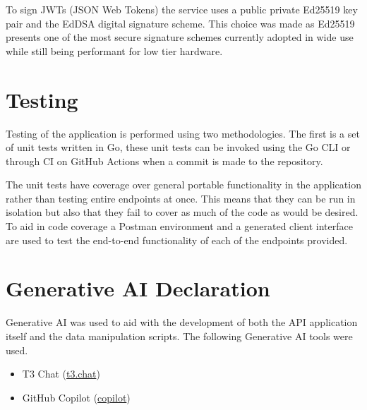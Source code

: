 \documentclass[10pt,a4paper]{article}
\begin{document}
\noindent
\newline
To sign JWTs (JSON Web Tokens) the service uses a public private Ed25519 key pair and the EdDSA digital signature scheme. This choice was made as Ed25519 presents one of the most secure signature schemes currently adopted in wide use while still being performant for low tier hardware.


\section{Testing}

Testing of the application is performed using two methodologies. The first is a set of unit tests written in Go, these unit tests can be invoked using the Go CLI or through CI on GitHub Actions when a commit is made to the repository.

\noindent
\newline
The unit tests have coverage over general portable functionality in the application rather than testing entire endpoints at once. This means that they can be run in isolation but also that they fail to cover as much of the code as would be desired. To aid in code coverage a Postman environment and a generated client interface are used to test the end-to-end functionality of each of the endpoints provided.

\section{Generative AI Declaration}

Generative AI was used to aid with the development of both the API application itself and the data manipulation scripts. The following Generative AI tools were used.

\begin{itemize}
  \item T3 Chat (\href{https://t3.chat}{t3.chat})
  \item GitHub Copilot (\href{https://github.com/features/copilot}{copilot})
\end{itemize}
\end{document}
